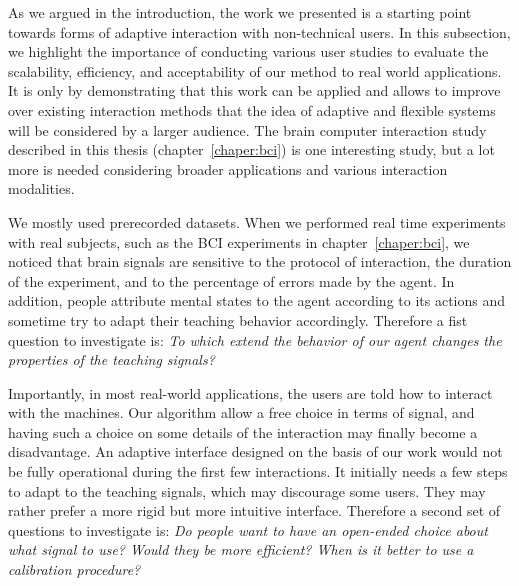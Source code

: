 
As we argued in the introduction, the work we presented is a starting point towards forms of adaptive interaction with non-technical users. In this subsection, we highlight the importance of conducting various user studies to evaluate the scalability, efficiency, and acceptability of our method to real world applications. It is only by demonstrating that this work can be applied and allows to improve over existing interaction methods that the idea of adaptive and flexible systems will be considered by a larger audience. The brain computer interaction study described in this thesis (chapter~\ref{chaper:bci}) is one interesting study, but a lot more is needed considering broader applications and various interaction modalities.

We mostly used prerecorded datasets. When we performed real time experiments with real subjects, such as the BCI experiments in chapter~\ref{chaper:bci}, we noticed that brain signals are sensitive to the protocol of interaction, the duration of the experiment, and to the percentage of errors made by the agent. In addition, people attribute mental states to the agent according to its actions and sometime try to adapt their teaching behavior accordingly. Therefore a fist question to investigate is: \emph{To which extend the behavior of our agent changes the properties of the teaching signals?}


Importantly, in most real-world applications, the users are told how to interact with the machines. Our algorithm allow a free choice in terms of signal, and having such a choice on some details of the interaction may finally become a disadvantage. An adaptive interface designed on the basis of our work would not be fully operational during the first few interactions. It initially needs a few steps to adapt to the teaching signals, which may discourage some users. They may rather prefer a more rigid but more intuitive interface. Therefore a second set of questions to investigate is: \emph{Do people want to have an open-ended choice about what signal to use? Would they be more efficient? When is it better to use a calibration procedure?}

